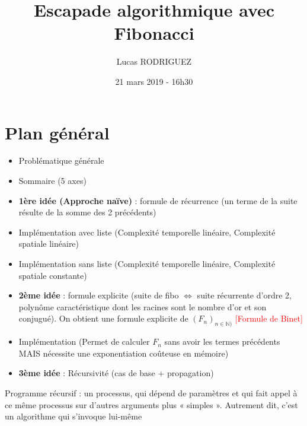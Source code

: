 \documentclass[11pt,a4paper]{article}
\author{Lucas RODRIGUEZ}
\date{21 mars 2019 - 16h30}
\title{Escapade algorithmique avec Fibonacci}
\begin{document}
\maketitle

\section*{Plan général}
\begin{itemize}
\item Problématique générale
\item Sommaire (5 axes)
\item \textbf{1ère idée (Approche naïve)} : formule de récurrence (un terme de la suite résulte de la somme des 2 précédents)
\item Implémentation avec liste (Complexité temporelle linéaire, Complexité spatiale linéaire)
\item Implémentation sans liste (Complexité temporelle linéaire, Complexité spatiale constante)
\item \textbf{2ème idée} : formule explicite (suite de fibo $\Longleftrightarrow$ suite récurrente d'ordre 2, polynôme caractéristique dont les racines sont le nombre d'or et son conjugué). On obtient une formule explicite de $(F_n)_{n\in \mathbb{N})}$ \textcolor{red}{[Formule de Binet]}
\item Implémentation (Permet de calculer $F_n$ sans avoir les termes précédents MAIS nécessite une exponentiation coûteuse en mémoire)
\item \textbf{3ème idée} : Récursivité (cas de base + propagation)
\end{itemize}
Programme récursif : un processus, qui dépend de paramètres et qui fait appel à ce même processus sur d'autres arguments plus « simples ». Autrement dit, c'est un algorithme qui s'invoque lui-même
\end{document}
